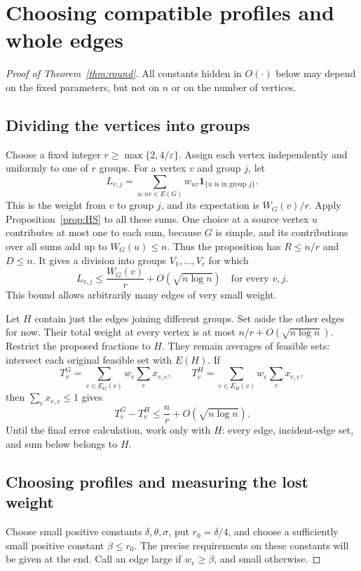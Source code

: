 \documentclass[11pt]{article}
\theoremstyle{definition}\newtheorem{algorithm}{Algorithm}[section]
\numberwithin{equation}{section}
\theoremstyle{remark}\newtheorem*{remark}{Remark}
\newcommand{\one}{\mathbf 1}
\newcommand{\eps}{\varepsilon}
\begin{document}
\section{Choosing compatible profiles and whole edges}\label{sec:round-proof}
\begin{proof}[Proof of Theorem~\ref{thm:round}]
All constants hidden in $O(\cdot)$ below may depend on the fixed parameters,
but not on $n$ or on the number of vertices.


\subsection*{Dividing the vertices into groups}
Choose a fixed integer $r\ge\max\{2,4/\eps\}$. Assign each vertex
independently and uniformly to one of $r$ groups. For a vertex $v$ and
group $j$, let
\[
 L_{v,j}=\sum_{u:uv\in E(G)}w_{uv}\one_{\{u\text{ is in group }j\}}.
\]
This is the weight from $v$ to group $j$, and its expectation is
$W_G(v)/r$. Apply Proposition~\ref{prop:HS} to all these sums. One
choice at a source vertex $u$ contributes at most one to each sum,
because $G$ is simple, and its contributions over all sums add up to
$W_G(u)\le n$. Thus the proposition has $R\le n/r$ and $D\le n$.
It gives a division into groups $V_1,\ldots,V_r$ for which
\[
 L_{v,j}\le \frac{W_G(v)}r+O(\sqrt{n\log n})
 \quad\text{for every }v,j.
\]
This bound allows arbitrarily many edges of very small weight.

Let $H$ contain just the edges joining different groups. Set aside the
other edges for now. Their total weight at every vertex is at most
$n/r+O(\sqrt{n\log n})$. Restrict the proposed fractions to $H$.
They remain averages of feasible sets: intersect each original feasible
set with $E(H)$. If
\[
 T_v^G=\sum_{e\in E_G(v)}w_e\sum_cx_{e,c},\qquad
 T_v^H=\sum_{e\in E_H(v)}w_e\sum_cx_{e,c},
\]
then $\sum_cx_{e,c}\le1$ gives
\begin{equation}\label{eq:deleted-weight}
 T_v^G-T_v^H\le \frac nr+O(\sqrt{n\log n}).
\end{equation}
Until the final error calculation, work only with $H$: every edge,
incident-edge set, and sum below belongs to $H$.

\subsection*{Choosing profiles and measuring the lost weight}
Choose small positive constants $\delta,\theta,\sigma$, put $r_0=\delta/4$,
and choose a sufficiently small positive constant $\beta\le r_0$.
The precise requirements on these constants will be given at the end.
Call an edge large if $w_e\ge\beta$, and small otherwise.


\end{proof}
\end{document}
